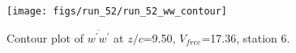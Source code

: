 \begin{figure}[H]
\centering
\texttt{[image: figs/run\_52/run\_52\_ww\_contour]}
\caption{Contour plot of $\overline{w^\prime w^\prime}$ at $z/c$=9.50, $V_{free}$=17.36, station 6.}
\label{fig:run_52_ww_contour}
\end{figure}


